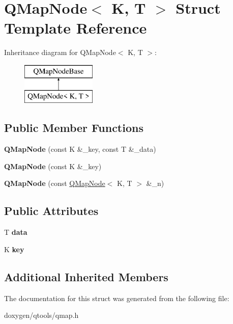 \hypertarget{struct_q_map_node}{}\section{Q\+Map\+Node$<$ K, T $>$ Struct Template Reference}
\label{struct_q_map_node}
Inheritance diagram for Q\+Map\+Node$<$ K, T $>$\+:\begin{figure}[H]
\begin{center}
\leavevmode
\includegraphics[height=2.000000cm]{struct_q_map_node}
\end{center}
\end{figure}
\subsection*{Public Member Functions}
\begin{DoxyCompactItemize}
\item 
\mbox{\label{struct_q_map_node_a07e2c7e12054e93fe05c426815890ac0}} 
{\bfseries Q\+Map\+Node} (const K \&\+\_\+key, const T \&\+\_\+data)
\item 
\mbox{\label{struct_q_map_node_a83c2ba24e5f81421eda88a5001ca95c3}} 
{\bfseries Q\+Map\+Node} (const K \&\+\_\+key)
\item 
\mbox{\label{struct_q_map_node_a55ed928e9d27d83f736044f741fec2e6}} 
{\bfseries Q\+Map\+Node} (const \mbox{\hyperlink{struct_q_map_node}{Q\+Map\+Node}}$<$ K, T $>$ \&\+\_\+n)
\end{DoxyCompactItemize}
\subsection*{Public Attributes}
\begin{DoxyCompactItemize}
\item 
\mbox{\label{struct_q_map_node_a91bef0c077e82dc30a9417b85bfb9d42}} 
T {\bfseries data}
\item 
\mbox{\label{struct_q_map_node_a907c0d39418e454f85669ea8dbbb41e6}} 
K {\bfseries key}
\end{DoxyCompactItemize}
\subsection*{Additional Inherited Members}


The documentation for this struct was generated from the following file\+:\begin{DoxyCompactItemize}
\item 
doxygen/qtools/qmap.\+h\end{DoxyCompactItemize}
